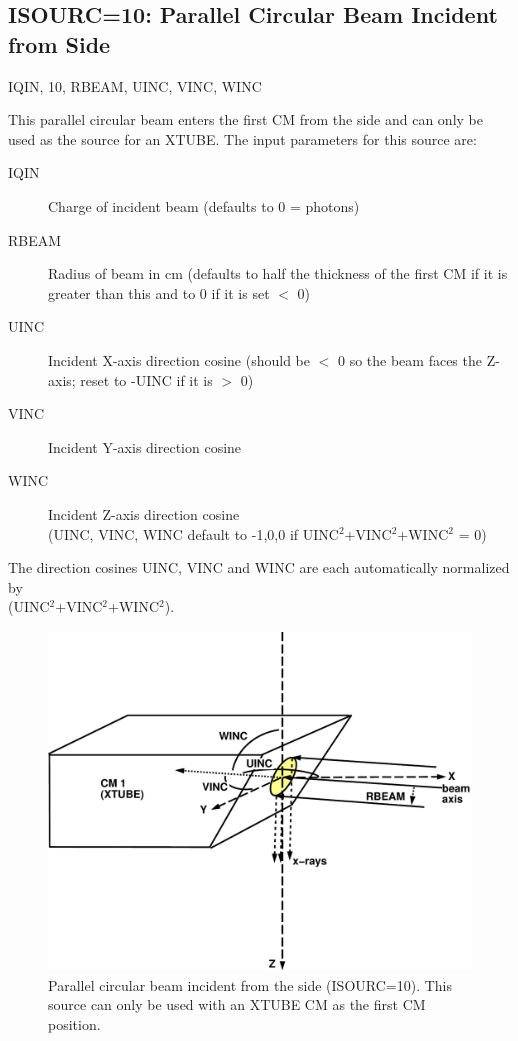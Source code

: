 \documentclass[12pt,twoside]{article}
\newcommand{\cen}[1]{\begin{center} #1 \end{center}                   }
\begin{document}
\clearpage

\subsection{ISOURC=10: Parallel Circular Beam Incident from Side}
\cen{IQIN, 10, RBEAM, UINC, VINC, WINC}
  

This parallel circular beam enters the first CM from the side and can only
be used as the source for an XTUBE.
The input parameters for this source are:
\begin{description}
\item [IQIN] Charge of incident beam (defaults to 0 = photons)
\item [RBEAM] Radius of beam in cm (defaults to half the thickness of the
first CM
if it is greater than this and to 0 if it is set $<$ 0)
\item [UINC] Incident X-axis direction cosine (should be $<$ 0 so the beam
faces the Z-axis; reset to -UINC if it is $>$ 0)
\item [VINC] Incident Y-axis direction cosine
\item [WINC] Incident Z-axis direction cosine\\
(UINC, VINC, WINC default to -1,0,0 if UINC$^2$+VINC$^2$+WINC$^2$ = 0)
\end{description}
The direction cosines UINC, VINC and WINC are each automatically
normalized by\\
(UINC$^2$+VINC$^2$+WINC$^2$).
\begin{figure}[htbp]
\begin{center}
\leavevmode
\mbox{}\hspace{0cm}
\includegraphics[height=9cm]{figures/src10}
\caption[ISOURC=10: Circular beam for XTUBE.]
{Parallel circular beam incident from the side (ISOURC=10).
This source can only be used with an XTUBE CM as the first CM
position.}
\label{fig_src10}
\end{center}
\end{figure}
\end{document}
